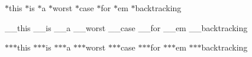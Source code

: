 $\ast$this $\ast$is $\ast$a $\ast$worst $\ast$case $\ast$for $\ast$em $\ast$backtracking

\+\_\+\+\_\+this \+\_\+\+\_\+is \+\_\+\+\_\+a \+\_\+\+\_\+worst \+\_\+\+\_\+case \+\_\+\+\_\+for \+\_\+\+\_\+em \+\_\+\+\_\+backtracking

$\ast$$\ast$$\ast$this $\ast$$\ast$$\ast$is $\ast$$\ast$$\ast$a $\ast$$\ast$$\ast$worst $\ast$$\ast$$\ast$case $\ast$$\ast$$\ast$for $\ast$$\ast$$\ast$em $\ast$$\ast$$\ast$backtracking 